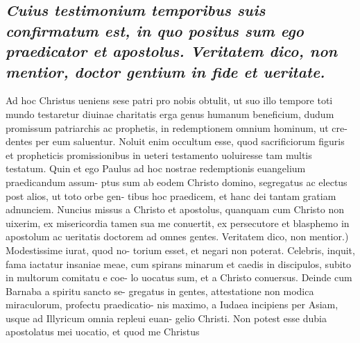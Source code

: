 \documentclass{article}
\begin{document}
\begin{pages}
{}
\subsection*{\textit{Cuius testimonium temporibus suis confirmatum est, in quo positus sum ego praedicator et apostolus. Veritatem dico, non mentior, doctor gentium in fide et ueritate. }}\pstart Ad hoc Christus ueniens sese patri pro nobis obtulit, ut suo illo tempore toti mundo testaretur diuinae charitatis erga genus humanum beneficium, dudum promissum patriarchis ac prophetis, in redemptionem omnium hominum, ut cre- dentes per eum saluentur. Noluit enim occultum esse, quod sacrificiorum figuris et propheticis promissionibus in ueteri testamento uoluiresse tam multis testatum. Quin et ego Paulus ad hoc nostrae redemptionis euangelium praedicandum assum- ptus sum ab eodem Christo domino, segregatus ac electus post alios, ut toto orbe gen- tibus hoc praedicem, et hanc dei tantam gratiam adnunciem. Nuncius missus a Christo et apostolus, quanquam cum Christo non uixerim, ex misericordia tamen sua me conuertit, ex persecutore et blasphemo in apostolum ac ueritatis doctorem ad omnes gentes. Veritatem dico, non mentior.) Modestissime iurat, quod no- torium esset, et negari non poterat. Celebris, inquit, fama iactatur insaniae meae, cum spirans minarum et caedis in discipulos, subito in multorum comitatu e coe- lo uocatus sum, et a Christo conuersus. Deinde cum Barnaba a spiritu sancto se- gregatus in gentes, attestatione non modica miraculorum, profectu praedicatio- nis maximo, a Iudaea incipiens per Asiam, usque ad Illyricum omnia repleui euan- gelio Christi. Non potest esse dubia apostolatus mei uocatio, et quod me Christus  \pend

\end{pages}
\end{document}
